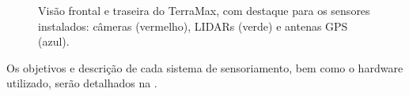 \begin{figure}[h]
\centering
{}\enskip
{}
\caption{Visão frontal e traseira do TerraMax, com destaque para os sensores instalados: câmeras (vermelho), LIDARs (verde) e antenas GPS (azul).}%
\label{fig:sensores}%
\end{figure}

Os objetivos e descrição de cada sistema de sensoriamento, bem como o hardware utilizado, serão detalhados na .


